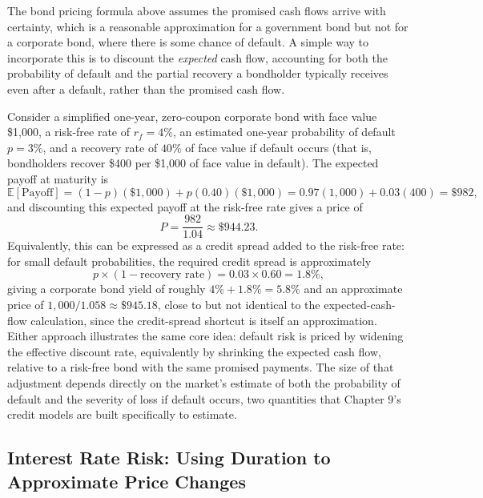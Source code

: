 \documentclass[../ai_in_finance]{subfiles}
\begin{document}
The bond pricing formula above assumes the promised cash flows arrive with certainty, which is a reasonable approximation for a government bond but not for a corporate bond, where there is some chance of default. A simple way to incorporate this is to discount the \emph{expected} cash flow, accounting for both the probability of default and the partial recovery a bondholder typically receives even after a default, rather than the promised cash flow.

Consider a simplified one-year, zero-coupon corporate bond with face value \$1,000, a risk-free rate of $r_f=4\%$, an estimated one-year probability of default $p=3\%$, and a recovery rate of $40\%$ of face value if default occurs (that is, bondholders recover \$400 per \$1,000 of face value in default). The expected payoff at maturity is
\begin{equation*}
\mathbb{E}[\text{Payoff}] = (1-p)(\$1{,}000) + p(0.40)(\$1{,}000) = 0.97(1{,}000) + 0.03(400) = \$982,
\end{equation*}
and discounting this expected payoff at the risk-free rate gives a price of
\begin{equation*}
P = \frac{982}{1.04} \approx \$944.23.
\end{equation*}
Equivalently, this can be expressed as a credit spread added to the risk-free rate: for small default probabilities, the required credit spread is approximately
$$p \times (1-\text{recovery rate}) = 0.03 \times 0.60 = 1.8\%,$$
giving a corporate bond yield of roughly $4\% + 1.8\% = 5.8\%$ and an approximate price of $1{,}000/1.058 \approx \$945.18$, close to but not identical to the expected-cash-flow calculation, since the credit-spread shortcut is itself an approximation. Either approach illustrates the same core idea: default risk is priced by widening the effective discount rate, equivalently by shrinking the expected cash flow, relative to a risk-free bond with the same promised payments. The size of that adjustment depends directly on the market's estimate of both the probability of default and the severity of loss if default occurs, two quantities that Chapter 9's credit models are built specifically to estimate.

\subsection{Interest Rate Risk: Using Duration to Approximate Price Changes}
\end{document}

